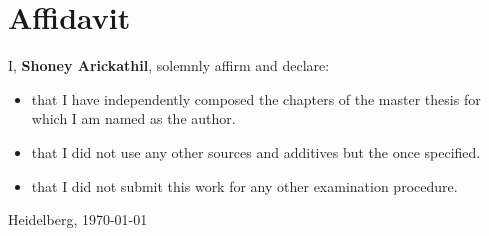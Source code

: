 
\section*{Affidavit}


I, \textbf{Shoney Arickathil}, solemnly affirm and declare:

\begin{itemize}
    \item that I have independently composed the chapters of the master thesis for which I am named as the author.
    \item that I did not use any other sources and additives but the once specified. 
    \item that I did not submit this work for any other examination procedure. 
\end{itemize}


\vspace*{5\baselineskip}


Heidelberg, \today \hspace*{1mm} \hrulefill
